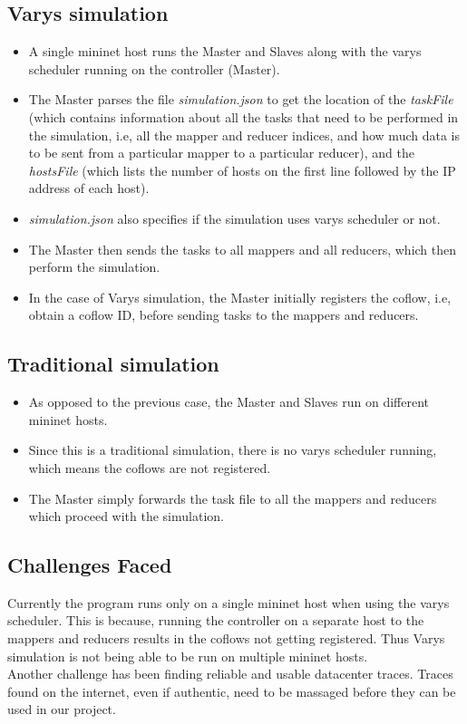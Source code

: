 \documentclass{article}
\begin{document}
\subsection{Varys simulation}
\begin{itemize}
	\item A single mininet host runs the Master and Slaves along with the varys\cite{varys} scheduler running on the controller (Master).
	\item The Master parses the file \textit{simulation.json} to get the location of the \textit{taskFile} (which contains information about all the tasks that need to be performed in the simulation, i.e, all the mapper and reducer indices, and how much data is to be sent from a particular mapper to a particular reducer), and the \textit{hostsFile} (which lists the number of hosts on the first line followed by the IP address of each host).
	\item \textit{simulation.json} also specifies if the simulation uses varys scheduler or not.
	\item The Master then sends the tasks to all mappers and all reducers, which then perform the simulation.
	\item In the case of Varys simulation, the Master initially registers the coflow, i.e, obtain a coflow ID, before sending tasks to the mappers and reducers.
\end{itemize}
\subsection{Traditional simulation}
\begin{itemize}
	\item As opposed to the previous case, the Master and Slaves run on different mininet hosts.
	\item Since this is a traditional simulation, there is no varys scheduler running, which means the coflows are not registered.
	\item The Master simply forwards the task file to all the mappers and reducers which proceed with the simulation.
\end{itemize}
\subsection{Challenges Faced}
Currently the program runs only on a single mininet host when using the varys scheduler. This is because, running the controller on a separate host to the mappers and reducers results in the coflows not getting registered. Thus Varys simulation is not being able to be run on multiple mininet hosts.\\Another challenge has been finding reliable and usable datacenter traces. Traces found on the internet, even if authentic, need to be massaged before they can be used in our project.
\end{document}
